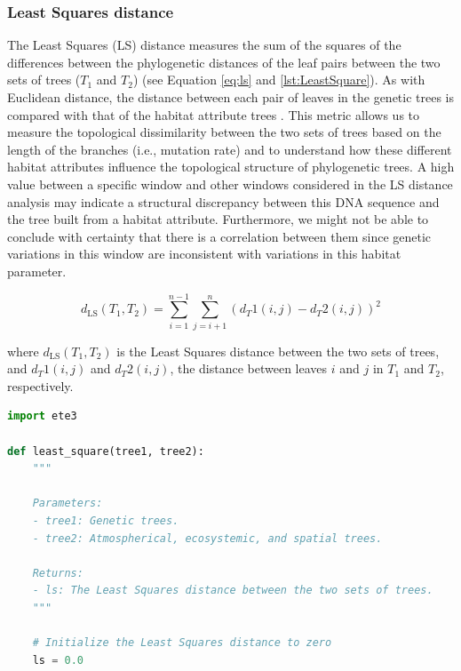 {\subsubsection{Least Squares distance}\label{LS}
The Least Squares (LS) distance measures the sum of the squares of the differences between the phylogenetic distances of the leaf pairs between the two sets of trees ($T_1$ and $T_2$) (see Equation \eqref{eq:ls} and \autoref{lst:LeastSquare}). As with Euclidean distance, the distance between each pair of leaves in the genetic trees is compared with that of the habitat attribute trees \citep{czarna2006topology, balaban2020apples}. This metric allows us to measure the topological dissimilarity between the two sets of trees based on the length of the branches (i.e., mutation rate) and to understand how these different habitat attributes influence the topological structure of phylogenetic trees. A high value between a specific window and other windows considered in the LS distance analysis may indicate a structural discrepancy between this DNA sequence and the tree built from a habitat attribute. Furthermore, we might not be able to conclude with certainty that there is a correlation between them since genetic variations in this window are inconsistent with variations in this habitat parameter.

\begin{equation}\label{eq:ls}
    d_{\text{LS}}(T_1, T_2) = \sum_{i=1}^{n-1}\sum_{j=i+1}^{n}(d_T1(i,j) - d_T2(i,j))^2
\end{equation}

where $d_{\text{LS}}(T_1, T_2)$ is the Least Squares distance between the two sets of trees, and $d_T1(i,j)$ and $d_T2(i,j)$, the distance between leaves $i$ and $j$ in $T_1$ and $T_2$, respectively.

\begin{lstlisting}[label=lst:LeastSquare, language=Python, caption=Python script for calculating the LSD using the ete3 package in the aPhyloGeo package]
import ete3

def least_square(tree1, tree2):
    """
    
    Parameters:
    - tree1: Genetic trees.
    - tree2: Atmospherical, ecosystemic, and spatial trees.

    Returns:
    - ls: The Least Squares distance between the two sets of trees.
    """
    
    # Initialize the Least Squares distance to zero
    ls = 0.0
    

\end{lstlisting}}
